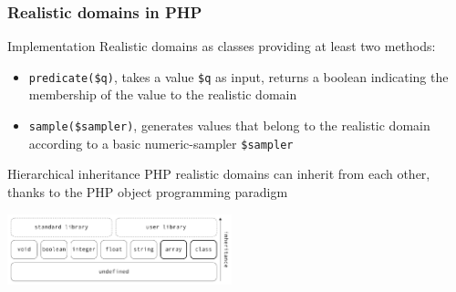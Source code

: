 \documentclass[9pt]{beamer}
\newcommand{\code}[1]{\texttt{#1}}
\begin{document}
\begin{frame}[fragile]
\frametitle{Realistic domains in PHP}

\begin{block}{Implementation}
Realistic domains as classes providing at least two methods:
\begin{itemize}
\item \code{predicate(\$q)}, takes a value \code{\$q} as input, returns a
boolean indicating the membership of the value to the realistic domain
\item \code{sample(\$sampler)}, generates values that belong to the realistic
domain according to a basic numeric-sampler \code{\$sampler}
\end{itemize}
\end{block}

\begin{block}{Hierarchical inheritance}
PHP realistic domains can inherit from each other, thanks to the PHP object
programming paradigm
\begin{center}
\includegraphics[width=6.5cm]{Figures/Realdom_univers.pdf}
\end{center}
\end{block}

\end{frame}
\end{document}
